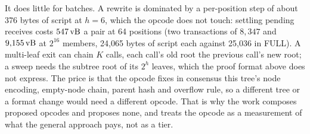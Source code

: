 It does little for batches. A rewrite is dominated by a per-position step of about 376 bytes of script at $h = 6$, which the opcode
does not touch: settling pending receives costs $547\,\mathrm{vB}$ a pair at 64
positions (two transactions of $8{,}347$ and $9{,}155\,\mathrm{vB}$ at $2^{16}$
members, 24{,}065 bytes of script each against 25{,}036 in FULL). A multi-leaf exit can chain $K$ calls, each call's old root the previous call's new root; a sweep needs the subtree root of its $2^h$ leaves, which the proof format above does not express.
The price is that the opcode fixes in consensus this tree's node encoding,
empty-node chain, parent hash and overflow rule, so a different tree or a
format change would need a different opcode. That is why the work composes
proposed opcodes and proposes none, and treats the opcode as a measurement
of what the general approach pays, not as a tier.
